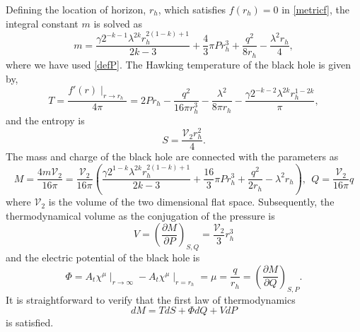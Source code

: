 \documentclass[preprint,showpacs,showkeys,onecolumn,nofootinbib]{revtex4}
\begin{document}
Defining the location of horizon, $r_h$, which satisfies  $f(r_h)=0$ in \eqref{metricf}, the integral constant $m$ is solved as
\begin{equation}
m=\frac{\gamma  2^{-k-1} \lambda ^{2 k} r_h^{2 (1-k)+1}}{2 k-3}+\frac{4}{3} \pi  P r_h^3+\frac{q^2}{8 r_h}-\frac{\lambda ^2 r_h}{4},
\end{equation}
where we have used \eqref{defP}. The Hawking temperature of the  black hole is given by,
\begin{equation}\label{Temp}
T =\frac{f'(r)\mid_{r\to r_h}}{4\pi}=2 P r_h-\frac{q^2}{16 \pi  r_h^3}-\frac{\lambda ^2}{8 \pi  r_h}-\frac{\gamma  2^{-k-2} \lambda ^{2 k} r_h^{1-2 k}}{\pi },
\end{equation}
and the entropy is
\begin{equation}\label{eq-S}
S =\frac{\mathcal{V}_2 r_h^2}{4}.
\end{equation}
The mass and charge of the black hole are connected with the parameters as\cite{BHMASS}
\begin{equation}\label{MQ}
M=\frac{4m\mathcal{V}_2}{16\pi}=\frac{\mathcal{V}_2}{16\pi}\left(\frac{\gamma  2^{1-k} \lambda ^{2 k} r_h^{2 (1-k)+1}}{2 k-3}+\frac{16}{3} \pi  P r_h^3+\frac{q^2}{2 r_h}-\lambda ^2 r_h\right),
~~Q=\frac{\mathcal{V}_2}{16\pi}q
\end{equation}
where $\mathcal{V}_2$ is the volume of the two dimensional flat space. Subsequently, the thermodynamical volume as the conjugation of the pressure  is
\begin{equation}\label{eq-V}
V=\left(\frac{\partial M}{\partial P}\right)_{S,Q}= \frac{\mathcal{V}_2}{3}r_h^3
\end{equation}
and the electric potential of the black hole is\cite{Caldarelli:1999xj,Cvetic:1999ne}
\begin{equation}
\Phi =A_{t}\chi^{\mu}\mid_{r\to\infty}-A_{t}\chi^{\mu}\mid_{r=r_h}=\mu=\frac{q}{r_h}=\left(\frac{\partial M}{\partial Q}\right)_{S,P}.
\end{equation}
It is straightforward to verify that the first law of thermodynamics
\begin{equation}\label{eq-dM0}
d M=T dS+\Phi dQ+V dP
\end{equation}
is satisfied.
\end{document}
